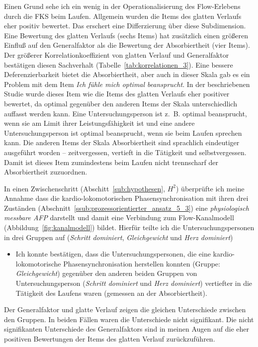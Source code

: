 Einen Grund sehe ich ein wenig in der Operationalisierung des Flow-Erlebens durch die \ac{FKS} beim Laufen. Allgemein wurden die Items des glatten Verlaufs eher positiv bewertet. Das erschert eine Differzierung über diese Subdimension. Eine Bewertung des glatten Verlaufs (sechs Items) hat zusätzlich einen größeren Einfluß auf den Generalfaktor als die Bewertung der Absorbiertheit (vier Items). Der größerer Korrelationkoeffizient von glatten Verlauf und Generalfaktor bestätigen diesen Sachverhalt (Tabelle~\ref{tab:korrelationen_3}). Eine bessere Deferenzierbarkeit bietet die Absorbiertheit, aber auch in dieser Skala gab es ein Problem mit dem Item \emph{Ich fühle mich optimal beansprucht}. In der beschriebenen Studie wurde dieses Item wie die Items des glatten Verlaufs eher positiver bewertet, da optimal gegenüber den anderen Items der Skala unterschiedlich auffasst werden kann. Eine Untersuchungsperson ist z.~B. optimal beansprucht, wenn sie am Limit ihrer Leistungsfähigkeit ist und eine andere Untersuchungsperson ist optimal beansprucht, wenn sie beim Laufen sprechen kann. Die anderen Items der Skala Absorbiertheit sind sprachlich eindeutiger ausgeführt worden -- zeitvergessen, vertieft in die Tätigkeit und selbstvergessen. Damit ist dieses Item zumindestens beim Laufen nicht trennscharf der Absorbiertheit zuzuordnen. 

In einen Zwischenschritt (Abschitt~\ref{sub:hypothesen}, $H^2$) überprüfte ich meine Annahme dass die kardio-lokomotorischen Phasensynchronisation mit ihren drei Zuständen (Abschnitt~\ref{ssub:prozessorientierter_ansatz_5_3}) eine \emph{physiologisch messbare \ac{AFP}} darstellt und damit eine Verbindung zum Flow-Kanalmodell (Abbildung~\ref{fig:kanalmodell}) bildet. Hierfür teilte ich die Untersuchungspersonen in drei Gruppen auf (\emph{Schritt dominiert}, \emph{Gleichgewicht} und \emph{Herz dominiert})
\begin{itemize}
	
	\item Ich konnte bestätigen, dass die Untersuchungspersonen, die eine kardio-lokomotorische Phasensynchronisation herstellen konnten (Gruppe: \emph{Gleichgewicht}) gegenüber den anderen beiden Gruppen von Untersuchungsperson (\emph{Schritt dominiert} und \emph{Herz dominiert}) vertiefter in die Tätigkeit des Laufens waren (gemessen an der Absorbiertheit).
\end{itemize}

Der Generalfaktor und glatte Verlauf zeigen die gleichen Unterschiede zwischen den Gruppen. In beiden Fällen waren die Unterschiede nicht signifikant. Die nicht signifikanten Unterschiede des Generalfaktors sind in meinen Augen auf die eher positiven Bewertungen der Items des glatten Verlauf zurückzuführen. 

